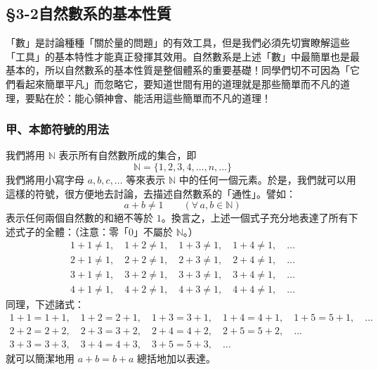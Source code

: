 \subsection{\S 3-2\quad 自然數系的基本性質}\label{sec:3-2}

「數」是討論種種「關於量的問題」的有效工具，但是我們必須先切實瞭解這些「工具」的基本特性才能真正發揮其效用。自然數系是上述「數」中最簡單也是最基本的，所以自然數系的基本性質是整個體系的重要基礎！同學們切不可因為「它們看起來簡單平凡」而忽略它，要知道世間有用的道理就是那些簡單而不凡的道理，要點在於：能心領神會、能活用這些簡單而不凡的道理！

\subsubsection*{甲、本節符號的用法}\label{subsec:nat_notation}

我們將用 $\mathbb{N}$ 表示所有自然數所成的集合，即
\begin{equation}\label{eq:set_N}
  \mathbb{N} = \{1, 2, 3, 4, \dots, n, \dots\}
\end{equation}
我們將用小寫字母 $a, b, c, \dots$ 等來表示 $\mathbb{N}$ 中的任何一個元素。於是，我們就可以用這樣的符號，很方便地去討論，去描述自然數系的「通性」。譬如：
\begin{equation}\label{eq:sum_not_one}
  a+b \neq 1 \qquad (\forall\, a, b \in \mathbb{N})
\end{equation}
表示任何兩個自然數的和絕不等於 $1$。換言之，上述一個式子充分地表達了所有下述式子的全體：（注意：零「$0$」不屬於 $\mathbb{N}$。）
\begin{align*}
  1+1 \neq 1, \quad 1+2 \neq 1, \quad 1+3 \neq 1, \quad 1+4 \neq 1, \quad \dots \\
  2+1 \neq 1, \quad 2+2 \neq 1, \quad 2+3 \neq 1, \quad 2+4 \neq 1, \quad \dots \\
  3+1 \neq 1, \quad 3+2 \neq 1, \quad 3+3 \neq 1, \quad 3+4 \neq 1, \quad \dots \\
  4+1 \neq 1, \quad 4+2 \neq 1, \quad 4+3 \neq 1, \quad 4+4 \neq 1, \quad \dots
\end{align*}
同理，下述諸式：
\begin{align*}
  1+1=1+1, \quad 1+2=2+1, \quad 1+3=3+1, \quad 1+4=4+1, \quad 1+5=5+1, \quad \dots \\
  2+2=2+2, \quad 2+3=3+2, \quad 2+4=4+2, \quad 2+5=5+2, \quad \dots \\
  3+3=3+3, \quad 3+4=4+3, \quad 3+5=5+3, \quad \dots
\end{align*}
就可以簡潔地用 $a+b = b+a$ 總括地加以表達。

